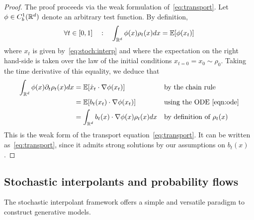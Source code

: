 \begin{proof}
	The proof proceeds via the weak formulation of~\cref{eq:transport}.
	Let $\phi\in C^1_b(\mathbb{R}^d) $ denote an arbitrary test function.
	By definition,
	\begin{equation}
		\label{def:exp:2}
		\forall t \in [0,1]\quad : \quad \int_{\mathbb{R}^d} \phi(x) \rho_t(x) dx =  \mathbb{E}[ \phi(x_t)]
	\end{equation}
	where $x_t$ is given by~\eqref{eq:stoch:interp} and where the expectation on the right hand-side is taken over the law of the initial conditions $x_{t=0}=x_0\sim\rho_0$.
	Taking the time derivative of this equality, we deduce that
	\begin{equation}
		\label{def:exp:diff2}
		\begin{aligned}
			\int_{\mathbb{R}^d} \phi(x) \partial_t \rho_t(x) dx & =  \mathbb{E}[\dot x_t \cdot \nabla \phi(x_t) ]                &  & \text{by the chain rule}             \\
			                                            & = \mathbb{E}[b_t(x_t) \cdot \nabla \phi(x_t) ]                 &  & \text{using the ODE~\eqref{eqn:ode}}
			\\
			                                            & = \int_{\mathbb{R}^d} b_t(x) \cdot \nabla \phi(x) \rho_t(x) dx &  & \text{by definition of $\rho_t(x)$}
		\end{aligned}
	\end{equation}
	This is the weak form of the transport equation~\eqref{eq:transport}.
	It can be written as~\eqref{eq:transport}, since it admits strong solutions by our assumptions on $b_t(x)$.
\end{proof}


\subsection{Stochastic interpolants and probability flows}
\label{secsi}
The stochastic interpolant framework offers a simple and versatile paradigm to construct generative models.

\sidef*

\pflow*

